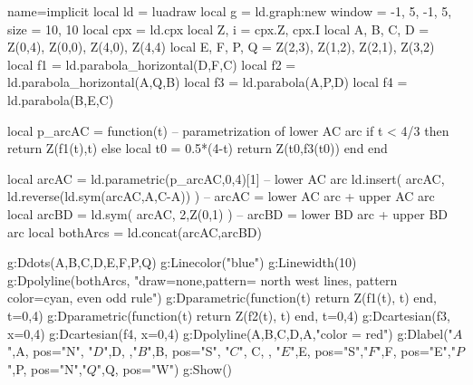 \documentclass[border=2mm ]{standalone}%
\begin{document}
\begin{luadraw}{name=implicit}
local ld = luadraw
local g = ld.graph:new{ window = {-1, 5, -1, 5}, size = {10, 10} }
local cpx = ld.cpx
local Z, i = cpx.Z, cpx.I  
local A, B, C, D = Z(0,4), Z(0,0), Z(4,0), Z(4,4)
local E, F, P, Q = Z(2,3), Z(1,2), Z(2,1), Z(3,2)
local f1 = ld.parabola_horizontal(D,F,C) 
local f2 = ld.parabola_horizontal(A,Q,B) 
local f3 = ld.parabola(A,P,D)
local f4 = ld.parabola(B,E,C)

local p_arcAC = function(t) -- parametrization of lower AC arc
    if t < 4/3 then return Z(f1(t),t)
    else 
        local t0 = 0.5*(4-t)
        return Z(t0,f3(t0)) end
end

local arcAC = ld.parametric(p_arcAC,0,4)[1] -- lower AC arc
ld.insert( arcAC, ld.reverse(ld.sym(arcAC,{A,C-A})) ) -- arcAC = lower AC arc + upper AC arc
local arcBD = ld.sym( arcAC, {2,Z(0,1)} ) -- arcBD = lower BD arc + upper BD arc
local bothArcs = ld.concat(arcAC,arcBD)

g:Ddots({A,B,C,D,E,F,P,Q})
g:Linecolor("blue") 
g:Linewidth(10) 
g:Dpolyline(bothArcs, "draw=none,pattern= north west lines, pattern color=cyan, even odd rule")  
g:Dparametric(function(t) return Z(f1(t), t) end, {t={0,4}})
g:Dparametric(function(t) return Z(f2(t), t) end, {t={0,4}})
g:Dcartesian(f3, {x={0,4}})
g:Dcartesian(f4, {x={0,4}})
g:Dpolyline({{A,B,C,D,A}},"color = red") 
g:Dlabel("$A$",A, {pos="N"}, "$D$",D, {},"$B$",B, {pos="S"},
"$C$", C, {}, "$E$",E, {pos="S"},"$F$",F, {pos="E"},"$P$",P, {pos="N"},"$Q$",Q, {pos="W"})
g:Show()
\end{luadraw}
\end{document}
